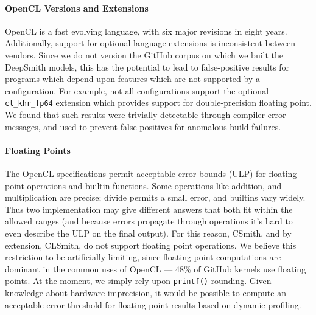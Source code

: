 \paragraph{OpenCL Versions and Extensions} OpenCL is a fast evolving language, with six major revisions in eight years. Additionally, support for optional language extensions is inconsistent between vendors. Since we do not version the GitHub corpus on which we built the DeepSmith models, this has the potential to lead to false-positive results for programs which depend upon features which are not supported by a configuration. For example, not all configurations support the optional \texttt{cl\_khr\_fp64} extension which provides support for double-precision floating point. We found that such results were trivially detectable through compiler error messages, and used to prevent false-positives for anomalous build failures.

\paragraph{Floating Points} The OpenCL specifications permit acceptable error bounds (ULP) for floating point operations and builtin functions. Some operations like addition, and multiplication are precise; divide permits a small error, and builtins vary widely. Thus two implementation may give different answers that both fit within the allowed ranges (and because errors propagate through operations it's hard to even describe the ULP on the final output). For this reason, CSmith, and by extension, CLSmith, do not support floating point operations. We believe this restriction to be artificially limiting, since floating point computations are dominant in the common uses of OpenCL --- %
48\% of GitHub kernels use floating points. At the moment, we simply rely upon \texttt{printf()} rounding. Given knowledge about hardware imprecision, it would be possible to compute an acceptable error threshold for floating point results based on dynamic profiling.

